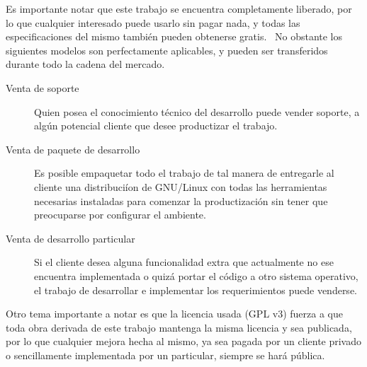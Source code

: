 Es importante notar que este trabajo se encuentra completamente liberado, por
lo que cualquier interesado puede usarlo sin pagar nada, y todas las
especificaciones del mismo tambi\'en pueden obtenerse gratis. \
No obstante los siguientes modelos son perfectamente aplicables, y pueden ser
transferidos durante todo la cadena del mercado.\\


\begin{description}
 \item[Venta de soporte] Quien posea el conocimiento t\'ecnico del desarrollo
puede vender soporte, a alg\'un potencial cliente que desee productizar el
trabajo. 

 \item[Venta de paquete de desarrollo] Es posible empaquetar todo el trabajo de
tal manera de entregarle al cliente una distribuci\'ion de GNU/Linux con todas
las herramientas necesarias instaladas para comenzar la productizaci\'on sin
tener que preocuparse por configurar el ambiente. 

 \item[Venta de desarrollo particular] Si el cliente desea alguna
funcionalidad extra que actualmente no ese encuentra implementada o quiz\'a
portar el c\'odigo a otro sistema operativo, el trabajo de desarrollar e
implementar los requerimientos puede venderse.
\end{description}

Otro tema importante a notar es que la licencia usada (GPL v3) fuerza a que
toda obra derivada de este trabajo mantenga la misma licencia y sea publicada,
por lo que cualquier mejora hecha al mismo, ya sea pagada por un cliente
privado o sencillamente implementada por un particular, siempre se har\'a
p\'ublica.




